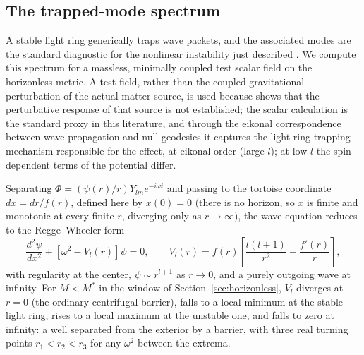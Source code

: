 \documentclass[11pt]{article}
\begin{document}
\subsection{The trapped-mode spectrum}
\label{sec:trapped}

A stable light ring generically traps wave packets, and the associated modes are the standard diagnostic for the nonlinear instability just described \citep{CardosoLongLived2014}. We compute this spectrum for a massless, minimally coupled test scalar field on the horizonless metric. A test field, rather than the coupled gravitational perturbation of the actual matter source, is used because \citet{PaperB} shows that the perturbative response of that source is not established; the scalar calculation is the standard proxy in this literature, and through the eikonal correspondence between wave propagation and null geodesics it captures the light-ring trapping mechanism responsible for the effect, at eikonal order (large $l$); at low $l$ the spin-dependent terms of the potential differ.

Separating $\Phi=(\psi(r)/r)Y_{lm}e^{-i\omega t}$ and passing to the tortoise coordinate $dx=dr/f(r)$, defined here by $x(0)=0$ (there is no horizon, so $x$ is finite and monotonic at every finite $r$, diverging only as $r\to\infty$), the wave equation reduces to the Regge--Wheeler form
\begin{equation}
\frac{d^2\psi}{dx^2}+\left[\omega^2-V_l(r)\right]\psi=0,\qquad V_l(r)=f(r)\left[\frac{l(l+1)}{r^2}+\frac{f'(r)}{r}\right],
\label{eq:RWpotential}
\end{equation}
with regularity at the center, $\psi\sim r^{l+1}$ as $r\to0$, and a purely outgoing wave at infinity. For $M<M^*$ in the window of Section~\ref{sec:horizonless}, $V_l$ diverges at $r=0$ (the ordinary centrifugal barrier), falls to a local minimum at the stable light ring, rises to a local maximum at the unstable one, and falls to zero at infinity: a well separated from the exterior by a barrier, with three real turning points $r_1<r_2<r_3$ for any $\omega^2$ between the extrema.
\end{document}
